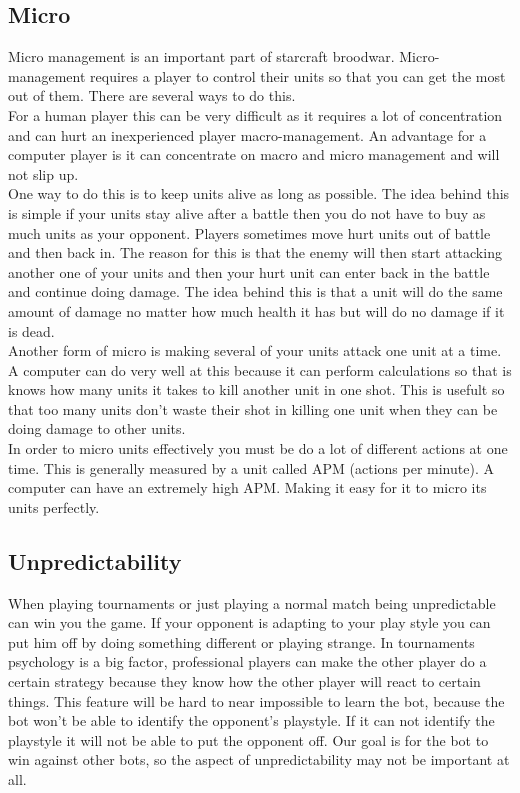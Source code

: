 				
	\subsection{Micro}
		Micro management is an important part of starcraft broodwar. 
		Micro-management requires a player to control their units so that you can get the most out of them. 
		There are several ways to do this.\\
		For a human player this can be very difficult as it requires a lot of concentration and can hurt an inexperienced player macro-management. 
		An advantage for a computer player is it can concentrate on macro and micro management and will not slip up.\\
		
		One way to do this is to keep units alive as long as possible. 
		The idea behind this is simple if your units stay alive after a battle then you do not have to buy as much units as your opponent. 
		Players sometimes move hurt units out of battle and then back in. 
		The reason for this is that the enemy will then start attacking another one of your 
		units and then your hurt unit can enter back in the battle and continue doing damage. 
		The idea behind this is that a unit will do the same amount of damage no matter how much health it has but will do no damage if it is dead.\\
		
		Another form of micro is making several of your units attack one unit at a time. 
		A computer can do very well at this because it can perform calculations so that is knows how many units it takes to kill another unit in one shot.
		This is usefult so that too many units don't waste their shot in killing one unit when they can be doing damage to other units.\\
		In order to micro units effectively you must be do a lot of different actions at one time. 
		This is generally measured by a unit called APM (actions per minute). 
		A computer can have an extremely high APM. Making it easy for it to micro its units perfectly.
		
	\subsection{Unpredictability}
		When playing tournaments or just playing a normal match being unpredictable can win you the game. 
		If your opponent is adapting to your play style you can put him off by doing something different or playing strange.
		In tournaments psychology is a big factor, professional players can make the other player do a certain strategy because they know 
		how the other player will react to certain things. This feature will be hard to near impossible to learn the bot, because the bot won't be able to 
		identify the opponent's playstyle. If it can not identify the playstyle it will not be able to put the opponent off. Our goal is for the bot 
		to win against other bots, so the aspect of unpredictability may not be important at all. 
